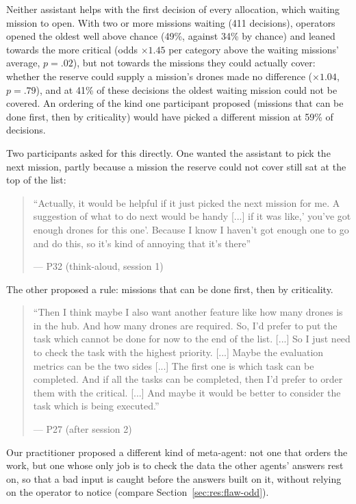 \label{sec:qual:new-jobs:queue-order}
Neither assistant helps with the first decision of every allocation, which waiting mission to open. With two or more missions waiting (411 decisions), operators opened the oldest well above chance (49\%, against 34\% by chance) and leaned towards the more critical (odds $\times 1.45$ per category above the waiting missions' average, $p = .02$), but not towards the missions they could actually cover: whether the reserve could supply a mission's drones made no difference ($\times 1.04$, $p = .79$), and at 41\% of these decisions the oldest waiting mission could not be covered. An ordering of the kind one participant proposed (missions that can be done first, then by criticality) would have picked a different mission at 59\% of decisions.

{\color{blue}Two participants asked for this directly. One wanted the assistant to pick the next mission, partly because a mission the reserve could not cover still sat at the top of the list:}

\begin{quote}\small
``Actually, it would be helpful if it just picked the next mission for me. A suggestion of what to do next would be handy [...] if it was like,' you've got enough drones for this one'. Because I know I haven't got enough one to go and do this, so it's kind of annoying that it's there''\par\hfill--- P32 (think-aloud, session 1)
\end{quote}

{\color{blue}The other proposed a rule: missions that can be done first, then by criticality.}

\begin{quote}\small
``Then I think maybe I also want another feature like how many drones is in the hub. And how many drones are required. So, I'd prefer to put the task which cannot be done for now to the end of the list. [...] So I just need to check the task with the highest priority. [...] Maybe the evaluation metrics can be the two sides [...] The first one is which task can be completed. And if all the tasks can be completed, then I'd prefer to order them with the critical. [...] And maybe it would be better to consider the task which is being executed.''\par\hfill--- P27 (after session 2)
\end{quote}

\label{sec:qual:practitioner:pt-red-team}
{\color{blue}Our practitioner proposed a different kind of meta-agent: not one that orders the work, but one whose only job is to check the data the other agents' answers rest on, so that a bad input is caught before the answers built on it, without relying on the operator to notice (compare Section~\ref{sec:res:flaw-odd}).}

